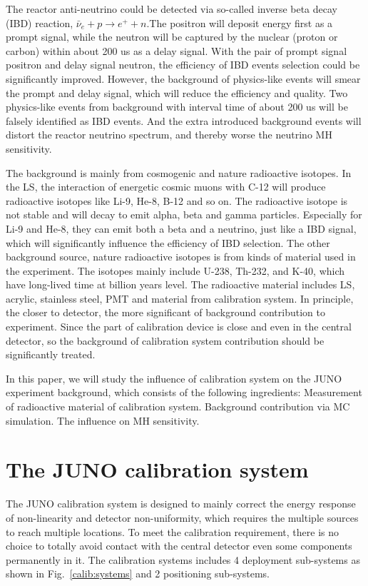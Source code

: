 \documentclass[review,number,sort&compress]{elsarticle}
\begin{document}
The reactor anti-neutrino could be detected via so-called inverse beta decay (IBD) reaction, $\bar{\nu}_{e}+p \rightarrow e^{+}+n $.The positron will deposit energy first as a prompt signal, while the neutron will be captured by the nuclear (proton or carbon) within about 200 us as a delay signal. 
With the pair of prompt signal positron and delay signal neutron, the efficiency of IBD events selection could be significantly improved. 
However, the background of physics-like events will smear the prompt and delay signal, which will reduce the efficiency and quality.
Two physics-like events from background with interval time of about 200 us will be falsely identified as IBD events.
And the extra introduced background events will distort the reactor neutrino spectrum, and thereby worse the neutrino MH sensitivity. 

The background is mainly from cosmogenic and nature radioactive isotopes.
In the LS, the interaction of energetic cosmic muons with C-12 will produce radioactive isotopes like Li-9, He-8, B-12 and so on.
The radioactive isotope is not stable and will decay to emit alpha, beta and gamma particles.
Especially for Li-9 and He-8, they can emit both a beta and a neutrino, just like a IBD signal, which will significantly influence the efficiency of IBD selection.  
The other background source, nature radioactive isotopes is from kinds of material used in the experiment.
The isotopes mainly include U-238, Th-232, and K-40, which have long-lived time at billion years level.
The radioactive material includes LS, acrylic, stainless steel, PMT and material from calibration system.
In principle, the closer to detector, the more significant of background contribution to experiment.
Since the part of calibration device is close and even in the central detector, so the background of calibration system contribution should be significantly treated. 

In this paper, we will study the influence of calibration system on the JUNO experiment background, which consists of the following ingredients: 
\noindent
Measurement of radioactive material of calibration system.
\noindent
Background contribution via MC simulation.
\noindent
The influence on MH sensitivity.

\section{The JUNO calibration system}

The JUNO calibration system is designed 
to mainly correct the energy response of non-linearity 
and detector non-uniformity, which requires the multiple 
sources to reach multiple locations.
To meet the calibration requirement, there is no choice to totally avoid contact with the central detector even some components permanently in it.
The calibration systems includes 4 deployment sub-systems as shown in Fig.~\ref{calib:systems} and 2 positioning sub-systems. 
\end{document}
